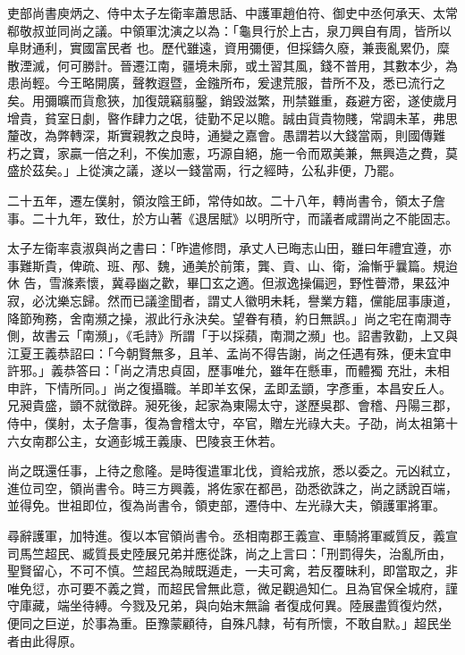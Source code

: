 \begin{pinyinscope}
 吏部尚書庾炳之、侍中太子左衛率蕭思話、中護軍趙伯符、御史中丞何承天、太常郗敬叔並同尚之議。中領軍沈演之以為：「龜貝行於上古，泉刀興自有周，皆所以阜財通利，實國富民者
 也。歷代雖遠，資用彌便，但採鑄久廢，兼喪亂累仍，糜散湮滅，何可勝計。晉遷江南，疆境未廓，或土習其風，錢不普用，其數本少，為患尚輕。今王略開廣，聲教遐暨，金鏹所布，爰逮荒服，昔所不及，悉已流行之矣。用彌曠而貨愈狹，加復競竊翦鑿，銷毀滋繁，刑禁雖重，姦避方密，遂使歲月增貴，貧室日劇，暋作肆力之氓，徒勤不足以贍。誠由貨貴物賤，常調未革，弗思釐改，為弊轉深，斯實親教之良時，通變之嘉會。愚謂若以大錢當兩，則國傳難
 朽之寶，家贏一倍之利，不俟加憲，巧源自絕，施一令而眾美兼，無興造之費，莫盛於茲矣。」上從演之議，遂以一錢當兩，行之經時，公私非便，乃罷。



 二十五年，遷左僕射，領汝陰王師，常侍如故。二十八年，轉尚書令，領太子詹事。二十九年，致仕，於方山著《退居賦》以明所守，而議者咸謂尚之不能固志。



 太子左衛率袁淑與尚之書曰：「昨遣修問，承丈人已晦志山田，雖曰年禮宜遵，亦事難斯貴，俾疏、班、邴、魏，通美於前策，龔、貢、山、衛，淪慚乎曩篇。規迨休
 告，雪滌素懷，冀尋幽之歡，畢囗玄之適。但淑逸操偏迥，野性瞢滯，果茲沖寂，必沈樂忘歸。然而已議塗聞者，謂丈人徽明未耗，譽業方籍，儻能屈事康道，降節殉務，舍南瀕之操，淑此行永決矣。望眷有積，約日無誤。」尚之宅在南澗寺側，故書云「南瀕」，《毛詩》所謂「于以採蘋，南澗之瀕」也。詔書敦勸，上又與江夏王義恭詔曰：「今朝賢無多，且羊、孟尚不得告謝，尚之任遇有殊，便未宜申許邪。」義恭答曰：「尚之清忠貞固，歷事唯允，雖年在懸車，而體獨
 充壯，未相申許，下情所同。」尚之復攝職。羊即羊玄保，孟即孟顗，字彥重，本昌安丘人。兄昶貴盛，顗不就徵辟。昶死後，起家為東陽太守，遂歷吳郡、會稽、丹陽三郡，侍中，僕射，太子詹事，復為會稽太守，卒官，贈左光祿大夫。子劭，尚太祖第十六女南郡公主，女適彭城王義康、巴陵哀王休若。



 尚之既還任事，上待之愈隆。是時復遣軍北伐，資給戎旅，悉以委之。元凶弒立，進位司空，領尚書令。時三方興義，將佐家在都邑，劭悉欲誅之，尚之誘說百端，
 並得免。世祖即位，復為尚書令，領吏部，遷侍中、左光祿大夫，領護軍將軍。



 尋辭護軍，加特進。復以本官領尚書令。丞相南郡王義宣、車騎將軍臧質反，義宣司馬竺超民、臧質長史陸展兄弟并應從誅，尚之上言曰：「刑罰得失，治亂所由，聖賢留心，不可不慎。竺超民為賊既遁走，一夫可禽，若反覆昧利，即當取之，非唯免愆，亦可要不義之賞，而超民曾無此意，微足觀過知仁。且為官保全城府，謹守庫藏，端坐待縛。今戮及兄弟，與向始末無論
 者復成何異。陸展盡質復灼然，便同之巨逆，於事為重。臣豫蒙顧待，自殊凡隸，茍有所懷，不敢自默。」超民坐者由此得原。




\end{pinyinscope}
